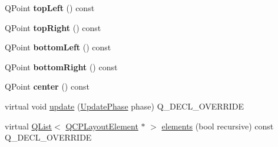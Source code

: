 \begin{DoxyCompactItemize}
Q\+Point {\bfseries top\+Left} () const
\item 
\mbox{\label{class_q_c_p_axis_rect_a7aa221967549ba71b98c465bf8234758}} 
Q\+Point {\bfseries top\+Right} () const
\item 
\mbox{\label{class_q_c_p_axis_rect_ab15d4311d6535ccd7af504dc0e2b98c6}} 
Q\+Point {\bfseries bottom\+Left} () const
\item 
\mbox{\label{class_q_c_p_axis_rect_a36dac884ec8fa3a3a2f3842ca7b7d32d}} 
Q\+Point {\bfseries bottom\+Right} () const
\item 
\mbox{\label{class_q_c_p_axis_rect_ade3aef874bafcec6dd16174fba44c0b1}} 
Q\+Point {\bfseries center} () const
\item 
virtual void \hyperlink{class_q_c_p_axis_rect_a8c9f5555c257955648465e8293adb7ef}{update} (\hyperlink{class_q_c_p_layout_element_a0d83360e05735735aaf6d7983c56374d}{Update\+Phase} phase) Q\+\_\+\+D\+E\+C\+L\+\_\+\+O\+V\+E\+R\+R\+I\+DE
\item 
virtual \hyperlink{class_q_list}{Q\+List}$<$ \hyperlink{class_q_c_p_layout_element}{Q\+C\+P\+Layout\+Element} $\ast$ $>$ \hyperlink{class_q_c_p_axis_rect_a516deca38a227006634ecb0456096982}{elements} (bool recursive) const Q\+\_\+\+D\+E\+C\+L\+\_\+\+O\+V\+E\+R\+R\+I\+DE
\end{DoxyCompactItemize}
